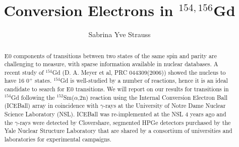 \documentclass[final,numrefs,sort&compress,noinfo]{nddiss2e}
\begin{document}
\frontmatter %

\title{Conversion Electrons in $^{154,156}$Gd}
\author{Sabrina Yve Strauss}

\maketitle
%
%

\makecopyright

\begin{abstract}
    E0 components of transitions between two states of the same spin and parity are challenging to measure, with sparse information available in nuclear databases. A recent study of $^{154}$Gd (D. A. Meyer et al, PRC 044309(2006)) showed the nucleus to have 16 0$^+$ states. $^{154}$Gd is well-studied by a number of reactions, hence it is an ideal candidate to search for E0 transitions. We will report on our results for transitions in $^{154}$Gd following the $^{152}$Sm($\alpha$,2n) reaction using the Internal Conversion Electron Ball (ICEBall) array in coincidence with $\gamma$-rays at the University of Notre Dame Nuclear Science Laboratory (NSL). ICEBall was re-implemented at the NSL 4 years ago and the $\gamma$-rays were detected by Clovershare, segmented HPGe detectors purchased by the Yale Nuclear Structure Laboratory that are shared by a consortium of universities and laboratories for experimental campaigns.
\end{abstract}

\renewcommand{\dedicationname}{To my parents, who always encouraged my love of science.\\
To Jolie, who introduced me to nuclear physics research.\\
To Ani, who helped keep me from going too far down side paths. \\
To all the people who put up with my mood swings.}
\end{document}

